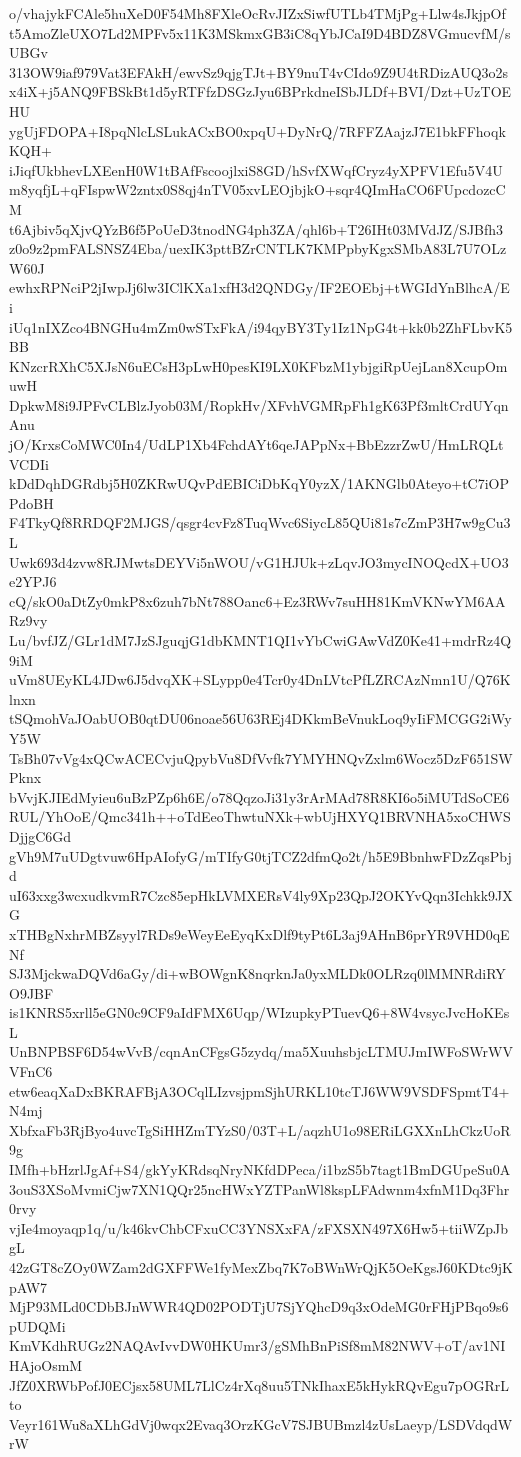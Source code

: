 o/vhajykFCAle5huXeD0F54Mh8FXleOcRvJIZxSiwfUTLb4TMjPg+Llw4sJkjpOf
t5AmoZleUXO7Ld2MPFv5x11K3MSkmxGB3iC8qYbJCaI9D4BDZ8VGmucvfM/sUBGv
313OW9iaf979Vat3EFAkH/ewvSz9qjgTJt+BY9nuT4vCIdo9Z9U4tRDizAUQ3o2s
x4iX+j5ANQ9FBSkBt1d5yRTFfzDSGzJyu6BPrkdneISbJLDf+BVI/Dzt+UzTOEHU
ygUjFDOPA+I8pqNlcLSLukACxBO0xpqU+DyNrQ/7RFFZAajzJ7E1bkFFhoqkKQH+
iJiqfUkbhevLXEenH0W1tBAfFscoojlxiS8GD/hSvfXWqfCryz4yXPFV1Efu5V4U
m8yqfjL+qFIspwW2zntx0S8qj4nTV05xvLEOjbjkO+sqr4QImHaCO6FUpcdozcCM
t6Ajbiv5qXjvQYzB6f5PoUeD3tnodNG4ph3ZA/qhl6b+T26IHt03MVdJZ/SJBfh3
z0o9z2pmFALSNSZ4Eba/uexIK3pttBZrCNTLK7KMPpbyKgxSMbA83L7U7OLzW60J
ewhxRPNciP2jIwpJj6lw3IClKXa1xfH3d2QNDGy/IF2EOEbj+tWGIdYnBlhcA/Ei
iUq1nIXZco4BNGHu4mZm0wSTxFkA/i94qyBY3Ty1Iz1NpG4t+kk0b2ZhFLbvK5BB
KNzcrRXhC5XJsN6uECsH3pLwH0pesKI9LX0KFbzM1ybjgiRpUejLan8XcupOmuwH
DpkwM8i9JPFvCLBlzJyob03M/RopkHv/XFvhVGMRpFh1gK63Pf3mltCrdUYqnAnu
jO/KrxsCoMWC0In4/UdLP1Xb4FchdAYt6qeJAPpNx+BbEzzrZwU/HmLRQLtVCDIi
kDdDqhDGRdbj5H0ZKRwUQvPdEBICiDbKqY0yzX/1AKNGlb0Ateyo+tC7iOPPdoBH
F4TkyQf8RRDQF2MJGS/qsgr4cvFz8TuqWvc6SiycL85QUi81s7cZmP3H7w9gCu3L
Uwk693d4zvw8RJMwtsDEYVi5nWOU/vG1HJUk+zLqvJO3mycINOQcdX+UO3e2YPJ6
cQ/skO0aDtZy0mkP8x6zuh7bNt788Oanc6+Ez3RWv7suHH81KmVKNwYM6AARz9vy
Lu/bvfJZ/GLr1dM7JzSJguqjG1dbKMNT1QI1vYbCwiGAwVdZ0Ke41+mdrRz4Q9iM
uVm8UEyKL4JDw6J5dvqXK+SLypp0e4Tcr0y4DnLVtcPfLZRCAzNmn1U/Q76Klnxn
tSQmohVaJOabUOB0qtDU06noae56U63REj4DKkmBeVnukLoq9yIiFMCGG2iWyY5W
TsBh07vVg4xQCwACECvjuQpybVu8DfVvfk7YMYHNQvZxlm6Wocz5DzF651SWPknx
bVvjKJIEdMyieu6uBzPZp6h6E/o78QqzoJi31y3rArMAd78R8KI6o5iMUTdSoCE6
RUL/YhOoE/Qmc341h++oTdEeoThwtuNXk+wbUjHXYQ1BRVNHA5xoCHWSDjjgC6Gd
gVh9M7uUDgtvuw6HpAIofyG/mTIfyG0tjTCZ2dfmQo2t/h5E9BbnhwFDzZqsPbjd
uI63xxg3wcxudkvmR7Czc85epHkLVMXERsV4ly9Xp23QpJ2OKYvQqn3Ichkk9JXG
xTHBgNxhrMBZsyyl7RDs9eWeyEeEyqKxDlf9tyPt6L3aj9AHnB6prYR9VHD0qENf
SJ3MjckwaDQVd6aGy/di+wBOWgnK8nqrknJa0yxMLDk0OLRzq0lMMNRdiRYO9JBF
is1KNRS5xrll5eGN0c9CF9aIdFMX6Uqp/WIzupkyPTuevQ6+8W4vsycJvcHoKEsL
UnBNPBSF6D54wVvB/cqnAnCFgsG5zydq/ma5XuuhsbjcLTMUJmIWFoSWrWVVFnC6
etw6eaqXaDxBKRAFBjA3OCqlLIzvsjpmSjhURKL10tcTJ6WW9VSDFSpmtT4+N4mj
XbfxaFb3RjByo4uvcTgSiHHZmTYzS0/03T+L/aqzhU1o98ERiLGXXnLhCkzUoR9g
IMfh+bHzrlJgAf+S4/gkYyKRdsqNryNKfdDPeca/i1bzS5b7tagt1BmDGUpeSu0A
3ouS3XSoMvmiCjw7XN1QQr25ncHWxYZTPanWl8kspLFAdwnm4xfnM1Dq3Fhr0rvy
vjIe4moyaqp1q/u/k46kvChbCFxuCC3YNSXxFA/zFXSXN497X6Hw5+tiiWZpJbgL
42zGT8cZOy0WZam2dGXFFWe1fyMexZbq7K7oBWnWrQjK5OeKgsJ60KDtc9jKpAW7
MjP93MLd0CDbBJnWWR4QD02PODTjU7SjYQhcD9q3xOdeMG0rFHjPBqo9s6pUDQMi
KmVKdhRUGz2NAQAvIvvDW0HKUmr3/gSMhBnPiSf8mM82NWV+oT/av1NIHAjoOsmM
JfZ0XRWbPofJ0ECjsx58UML7LlCz4rXq8uu5TNkIhaxE5kHykRQvEgu7pOGRrLto
Veyr161Wu8aXLhGdVj0wqx2Evaq3OrzKGcV7SJBUBmzl4zUsLaeyp/LSDVdqdWrW
